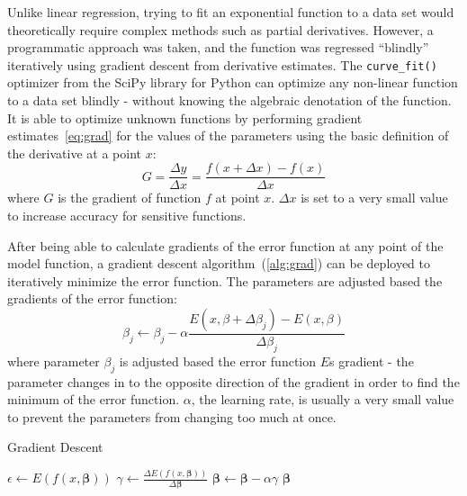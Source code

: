 \documentclass{mcmthesis}
\begin{document}
    Unlike linear regression, trying to fit an exponential function to a data set would theoretically require complex methods such as partial derivatives.
    However, a programmatic approach was taken, and the function was regressed ``blindly'' iteratively using gradient descent from derivative estimates.
    The \verb|curve_fit()| optimizer from the SciPy library for Python can optimize any non-linear function to a data set blindly - without knowing the algebraic denotation of the function.
    It is able to optimize unknown functions by performing gradient estimates~\eqref{eq:grad} for the values of the parameters using the basic definition of the derivative at a point $x$:
%
    \begin{equation}
        G = \frac{\Delta y}{\Delta x} = \frac{f(x + \Delta x) - f(x)}{\Delta x}
        \label{eq:grad}
    \end{equation}
%
    \noindent where $G$ is the gradient of function $f$ at point $x$.
    $\Delta x$ is set to a very small value to increase accuracy for sensitive functions.

    After being able to calculate gradients of the error function at any point of the model function, a gradient descent algorithm~(\ref{alg:grad}) can be deployed to iteratively minimize the error function.
    The parameters are adjusted based the gradients of the error function:
%
    \begin{equation}
        \beta_j \longleftarrow \beta_j - \alpha \frac{E(x, \beta + \Delta \beta_j) - E(x, \beta)}{\Delta \beta_j}
    \end{equation}
%
    \noindent where parameter $\beta_j$ is adjusted based the error function $E$\textquotesingle s gradient - the parameter changes in to the opposite direction of the gradient in order to find the minimum of the error function.
    $\alpha$, the learning rate, is usually a very small value to prevent the parameters from changing too much at once.

    \begin{algorithm}
        \caption{Gradient Descent}
        \label{alg:grad}
        \begin{algorithmic}
            \Repeat
                \State $\epsilon \gets E(f(x, \mathbf{\beta}))$  
                \State $\gamma \gets \frac{\Delta E(f(x, \mathbf{\beta}))}{\Delta \mathbf{\beta}}$  
                \State $\mathbf{\beta} \gets \mathbf{\beta} - \alpha \gamma$  
            \State \Return $\mathbf{\beta}$ 
        \end{algorithmic}
    \end{algorithm}
\end{document}
